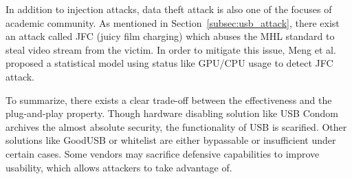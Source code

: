 In addition to injection attacks, data theft attack is also one of the focuses of academic community. As mentioned in Section~\ref{subsec:usb_attack}, there exist an attack called JFC (juicy film charging)\cite{JFC} which abuses the MHL standard to steal video stream from the victim. In order to mitigate this issue, Meng et al.\cite{JFC} proposed a statistical model using status like GPU/CPU usage to detect JFC attack.

To summarize, there exists a clear trade-off between the effectiveness and the plug-and-play property. Though hardware disabling solution like USB Condom archives the almost absolute security, the functionality of USB is scarified. Other solutions like GoodUSB or whitelist are either bypassable or insufficient under certain cases.
Some vendors may sacrifice defensive capabilities to improve usability, which allows attackers to take advantage of.

